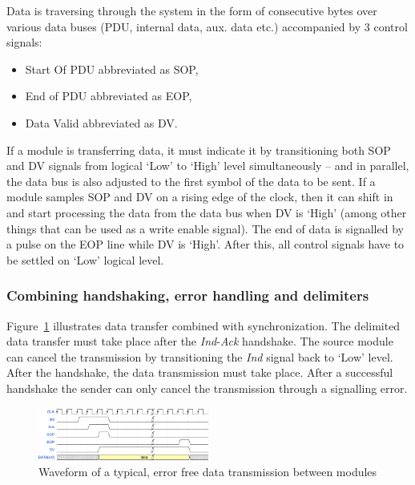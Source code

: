 \documentclass[conference]{IEEEtran}
\begin{document}
Data is traversing through the system in the form of consecutive bytes over various data buses (PDU, internal data, aux. data etc.) accompanied by 3 control signals:
\begin{itemize}
\renewcommand \labelitemi{--}
\item Start Of PDU abbreviated as SOP,
\item End of PDU abbreviated as EOP,
\item Data Valid abbreviated as DV.
\end{itemize}
If a module is transferring data, it must indicate it by transitioning both SOP and DV signals from logical `Low' to `High' level simultaneously -- and in parallel, the data bus is also adjusted to the first symbol of the data to be sent.
If a module samples SOP and DV on a rising edge of the clock, then it can shift in and start processing the data from the data bus when DV is `High' (among other things that can be used as a write enable signal).
The end of data is signalled by a pulse on the EOP line while DV is `High'. After this, all control signals have to be settled on `Low' logical level.

\subsubsection{Combining handshaking, error handling and delimiters}

Figure~\ref{fig:data_signals} illustrates data transfer combined with synchronization. The delimited data transfer must take place after the \emph{Ind}-\emph{Ack} handshake.
The source module can cancel the transmission by transitioning the \emph{Ind} signal back to `Low' level. After the handshake, the data transmission must take place. After a successful handshake the sender can only cancel the transmission through a signalling error.

\begin{figure}[!htb]
    \centering
    \includegraphics[width=0.5\textwidth]{figures_raw/data_signals.png}
    \caption{Waveform of a typical, error free data transmission between modules}
    \label{fig:data_signals}
\end{figure}
\end{document}
